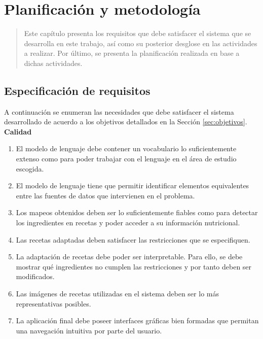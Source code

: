 \chapter{Planificación y metodología}
\label{ch:Capitulo 2}

\begin{quote}
  Este capítulo presenta los requisitos que debe satisfacer el sistema que se desarrolla en este trabajo, así como su posterior desglose en las actividades a realizar. Por último, se presenta la planificación realizada en base a dichas actividades.
\end{quote}


\section{Especificación de requisitos}

A continuación se enumeran las necesidades que debe satisfacer el sistema desarrollado de acuerdo a los objetivos detallados en la Sección \ref{sec:objetivos}.\\

\textbf{Calidad}
\begin{enumerate}
    \item El modelo de lenguaje debe contener un vocabulario lo suficientemente extenso como para poder trabajar con el lenguaje en el área de estudio escogida.%
    
    \item El modelo de lenguaje tiene que permitir identificar elementos equivalentes entre las fuentes de datos que intervienen en el problema.
    
    \item Los mapeos obtenidos deben ser lo suficientemente fiables como para detectar los ingredientes en recetas y poder acceder a su información nutricional.
    
    \item Las recetas adaptadas deben satisfacer las restricciones que se especifiquen. 
    
    \item La adaptación de recetas debe poder ser interpretable. Para ello, se debe mostrar qué ingredientes no cumplen las restricciones y por tanto deben ser modificados.

    \item Las imágenes de recetas utilizadas en el sistema deben ser lo más representativas posibles.%
    
    \item La aplicación final debe poseer interfaces gráficas bien formadas que permitan una navegación intuitiva por parte del usuario.%
\end{enumerate}

